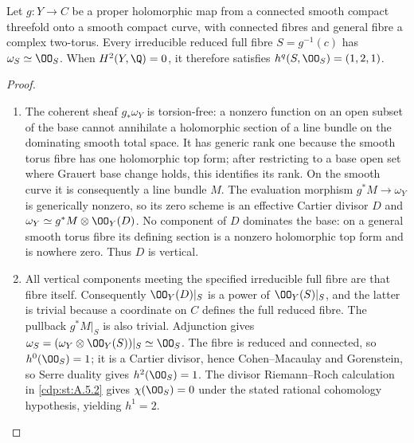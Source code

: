 \begin{proposition}\hypertarget{tag-01AT}{}\label{cdp:st:A.4.4}

Let $g:Y\to C$ be a proper holomorphic map from a connected smooth compact threefold onto a smooth compact curve, with connected fibres and general fibre a complex two-torus. Every irreducible reduced full fibre $S=g^{-1}(c)$ has $\omega_S\simeq\OO_S$. When $H^2(Y,\Q)=0$, it therefore satisfies $h^q(S,\OO_S)=(1,2,1)$.
\end{proposition}


\begin{proof}

\begin{enumerate}[label=\arabic*.,leftmargin=*]
\item The coherent sheaf $g_*\omega_Y$ is torsion-free: a nonzero function on an open subset of the base cannot annihilate a holomorphic section of a line bundle on the dominating smooth total space. It has generic rank one because the smooth torus fibre has one holomorphic top form; after restricting to a base open set where Grauert base change holds, this identifies its rank. On the smooth curve it is consequently a line bundle $M$. The evaluation morphism $g^*M\to\omega_Y$ is generically nonzero, so its zero scheme is an effective Cartier divisor $D$ and $\omega_Y\simeq g^*M\otimes\OO_Y(D)$. No component of $D$ dominates the base: on a general smooth torus fibre its defining section is a nonzero holomorphic top form and is nowhere zero. Thus $D$ is vertical.

\item All vertical components meeting the specified irreducible full fibre are that fibre itself. Consequently $\OO_Y(D)|_S$ is a power of $\OO_Y(S)|_S$, and the latter is trivial because a coordinate on $C$ defines the full reduced fibre. The pullback $g^*M|_S$ is also trivial. Adjunction gives $\omega_S=(\omega_Y\otimes\OO_Y(S))|_S\simeq\OO_S$. The fibre is reduced and connected, so $h^0(\OO_S)=1$; it is a Cartier divisor, hence Cohen--Macaulay and Gorenstein, so Serre duality gives $h^2(\OO_S)=1$. The divisor Riemann--Roch calculation in \ref{cdp:st:A.5.2} gives $\chi(\OO_S)=0$ under the stated rational cohomology hypothesis, yielding $h^1=2$.

\end{enumerate}
\end{proof}